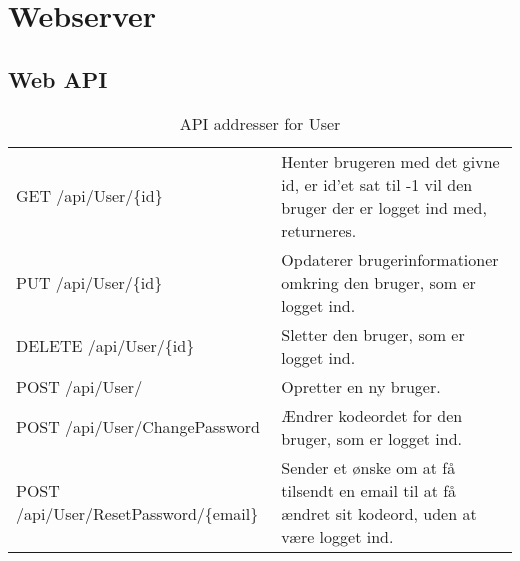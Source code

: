 \section{Webserver}

\subsection{Web API}

\begin{table}[H]
	\centering
	\caption{API addresser for User}
	\label{tab:web_user}
	\begin{tabular}{|L{0.3\textwidth}|L{0.70\textwidth}|}
		\hline
		\\
		\hline
		GET \newline
		/api/User/\{id\} &
		Henter brugeren med det givne id, er id'et sat til -1 vil den bruger der er logget ind med, returneres. \\
		\hline
		PUT \newline
		/api/User/\{id\} &
		Opdaterer brugerinformationer omkring den bruger, som er logget ind. \\
		\hline
		DELETE \newline
		/api/User/\{id\} &
		Sletter den bruger, som er logget ind. \\
		\hline
		POST \newline
		/api/User/ &
		Opretter en ny bruger. \\
		\hline
		POST \newline
		/api/User/ChangePassword &
		Ændrer kodeordet for den bruger, som er logget ind. \\
		\hline
		POST \newline
		/api/User/ResetPassword/\{email\} &
		Sender et ønske om at få tilsendt en email til at få ændret sit kodeord, uden at være logget ind. 
		\\
		\hline
	\end{tabular}
\end{table}

